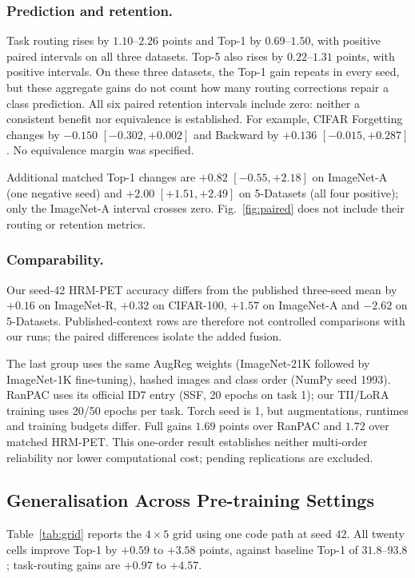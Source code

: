\documentclass[runningheads]{llncs}
\begin{document}
\subsubsection{Prediction and retention.}
Task routing rises by $1.10$--$2.26$ points and Top-1 by
$0.69$--$1.50$, with positive paired intervals on all three datasets.
Top-5 also rises by $0.22$--$1.31$ points, with positive intervals.
On these three datasets, the Top-1 gain repeats in every seed, but these
aggregate gains do not count how many routing corrections repair a class
prediction. All six paired retention intervals include zero: neither a
consistent benefit nor equivalence is established. For example, CIFAR
Forgetting changes by $-0.150$ $[-0.302,+0.002]$ and Backward by $+0.136$
$[-0.015,+0.287]$. No equivalence margin was specified.

Additional matched Top-1 changes are $+0.82$ $[-0.55,+2.18]$ on ImageNet-A
(one negative seed) and $+2.00$ $[+1.51,+2.49]$ on 5-Datasets (all four
positive); only the ImageNet-A interval crosses zero. Fig.~\ref{fig:paired}
does not include their routing or retention metrics.

\subsubsection{Comparability.}
Our seed-42 HRM-PET accuracy differs from the published three-seed mean by
$+0.16$ on ImageNet-R, $+0.32$ on CIFAR-100, $+1.57$ on ImageNet-A and
$-2.62$ on 5-Datasets. Published-context rows are therefore not controlled
comparisons with our runs; the paired differences isolate the added fusion.

The last group uses the same AugReg weights (ImageNet-21K followed by
ImageNet-1K fine-tuning), hashed images and class order (NumPy seed 1993).
RanPAC uses its official ID7 entry
(SSF, 20 epochs on task 1); our TII/LoRA training uses 20/50 epochs per task.
Torch seed is 1, but augmentations, runtimes and training budgets differ.
Full gains $1.69$ points over RanPAC and $1.72$ over matched HRM-PET.
This one-order result establishes neither multi-order reliability nor lower
computational cost; pending replications are excluded.

\subsection{Generalisation Across Pre-training Settings}
\label{sec:grid}

Table~\ref{tab:grid} reports the $4\times5$ grid using one code path at seed $42$.
All twenty cells improve Top-1 by $+0.59$ to $+3.58$ points, against
baseline Top-1 of $31.8$--$93.8$; task-routing gains are
$+0.97$ to $+4.57$.
\end{document}

